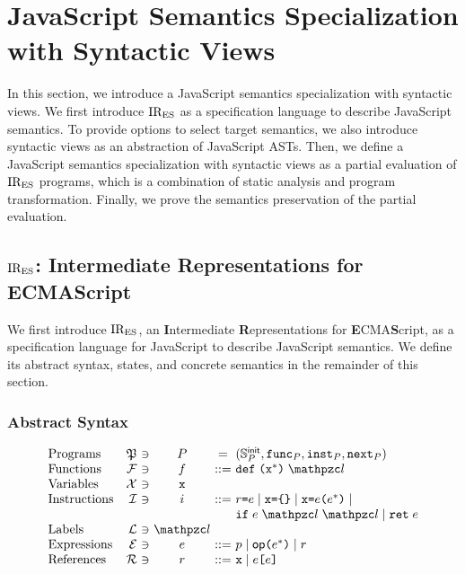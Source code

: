 \section{JavaScript Semantics Specialization with Syntactic Views}\label{sec:formal}

In this section, we introduce a JavaScript semantics specialization with
syntactic views.  We first introduce $\text{IR}_\text{ES}$ as a specification language to
describe JavaScript semantics. To provide options to select target semantics, we
also introduce syntactic views as an abstraction of JavaScript ASTs.  Then, we
define a JavaScript semantics specialization with syntactic views as a partial
evaluation of $\text{IR}_\text{ES}$ programs, which is a combination of static analysis and
program transformation. Finally, we prove the semantics preservation of the
partial evaluation.

\subsection{$\text{IR}_\text{ES}$: Intermediate Representations for ECMAScript}

We first introduce $\text{IR}_\text{ES}$, an \textbf{I}ntermediate \textbf{R}epresentations
for \textbf{E}CMA\textbf{S}cript, as a specification language for JavaScript to
describe JavaScript semantics. We define its abstract syntax, states, and
concrete semantics in the remainder of this section.

\subsubsection{Abstract Syntax}

\[
  \begin{array}{lr@{~}c@{~}c@{~}c@{~}l}
    \text{Programs} & \progset &\ni& \prog &=& (\initstset{\prog},
    \getfunc{\prog}, \getinst{\prog}, \getnext{\prog})\\

    \text{Functions} & \funcset &\ni& \func &::=&
    \kwdef \; \kwrl \varx^* \kwrr \; \lab\\

    \text{Variables} & \varset &\ni& \varx\\

    \text{Instructions} & \instset &\ni& \inst &::=&
    \refer \kweq \expr \mid
    \varx \kweq \kwcl \kwcr \mid
    \varx \kweq \expr \kwrl \expr^* \kwrr \mid \\&&&&&
    \kwif \; \expr \; \lab \; \lab \mid
    \kwret \; \expr\\

    \text{Labels} & \labset &\ni& \lab\\

    \text{Expressions} & \exprset &\ni& \expr &::=&
    \pval \mid
    \op \kwrl \expr^* \kwrr \mid
    \refer\\

    \text{References} & \referset &\ni& \refer &::=&
    \varx \mid \expr \kwsl \expr \kwsr\\
  \end{array}
\]

